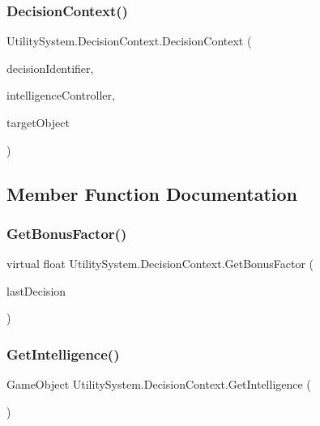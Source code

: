 \subsubsection{\texorpdfstring{Decision\+Context()}{DecisionContext()}}
{\footnotesize\ttfamily Utility\+System.\+Decision\+Context.\+Decision\+Context (\begin{DoxyParamCaption}\item[{int}]{decision\+Identifier,  }\item[{Game\+Object}]{intelligence\+Controller,  }\item[{Game\+Object}]{target\+Object }\end{DoxyParamCaption})}



\subsection{Member Function Documentation}
\mbox{\label{class_utility_system_1_1_decision_context_a811906f5fd74646edde4031a947e81c2}} 
\subsubsection{\texorpdfstring{Get\+Bonus\+Factor()}{GetBonusFactor()}}
{\footnotesize\ttfamily virtual float Utility\+System.\+Decision\+Context.\+Get\+Bonus\+Factor (\begin{DoxyParamCaption}\item[{\mbox{\hyperlink{class_utility_system_1_1_decision_context}{Decision\+Context}}}]{last\+Decision }\end{DoxyParamCaption})\hspace{0.3cm}{\ttfamily [virtual]}}

\mbox{\label{class_utility_system_1_1_decision_context_a05391232347edeb491c3a918414a2bc7}} 
\subsubsection{\texorpdfstring{Get\+Intelligence()}{GetIntelligence()}}
{\footnotesize\ttfamily Game\+Object Utility\+System.\+Decision\+Context.\+Get\+Intelligence (\begin{DoxyParamCaption}{ }\end{DoxyParamCaption})}




